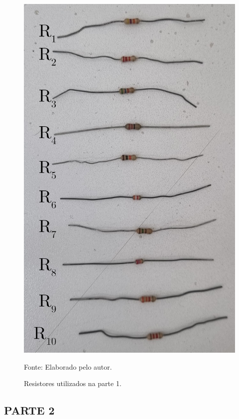 \documentclass[12pt]{article}
\begin{document}
\begin{figure}[H]
    \centering
    \caption{Resistores utilizados na parte 1.}
    \begin{minipage}{0.45\textwidth}
        \centering
        \includegraphics[width=\textwidth]{external-figures/resistores-pratica1.png}\\
        \raggedright\footnotesize{Fonte: Elaborado pelo autor.}
        \label{fig:pratica1}
    \end{minipage}
\end{figure}

\subsection{PARTE 2}\indent
\end{document}
